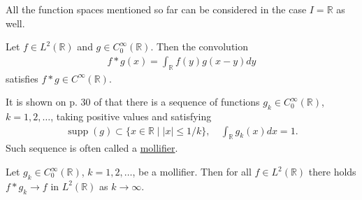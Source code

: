 \documentclass[12pt,oneside,final]{amsart}
\def\R{\mathbb R}
\DeclareMathOperator{\supp}{supp}
\begin{document}
All the function spaces mentioned so far can be considered in the case $I = \R$ as well.

\begin{theorem}\label{th_smoothing}
Let $f \in L^2(\R)$ and $g \in C_0^\infty(\R)$. Then the convolution
    \begin{align*}
f * g(x) = \int_\R f(y) g(x - y) dy
    \end{align*}
satisfies $f * g \in C^\infty(\R)$.
\end{theorem}

It is shown on p. 30 of \cite{Holopainen} that 
there is a sequence of functions $g_k \in C_0^\infty(\R)$, $k=1,2,\dots$, taking positive values and satisfying 
    \begin{align}\label{def_mollifier}
\supp(g) \subset \{x \in \R \mid |x| \le 1/k\},
\quad
\int_\R g_k(x) dx = 1.
    \end{align}
Such sequence is often called a \href{https://en.wikipedia.org/wiki/Mollifier}{mollifier}.

\begin{theorem}\label{th_mollification}
Let $g_k \in C_0^\infty(\R)$, $k=1,2,\dots$,
be a mollifier. Then for all $f \in L^2(\R)$ there holds $f * g_k \to f$ in $L^2(\R)$ as $k \to \infty$. 
\end{theorem}
\end{document}
